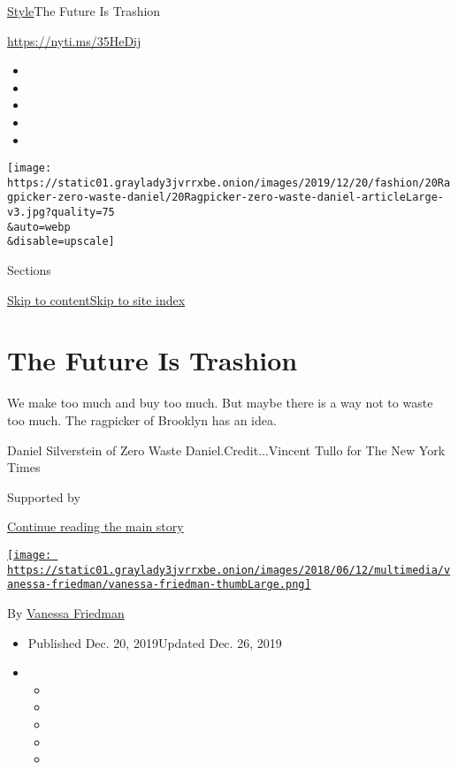 \href{/section/style}{Style}\textbar{}The Future Is Trashion

\href{https://nyti.ms/35HeDij}{https://nyti.ms/35HeDij}

\begin{itemize}
\item
\item
\item
\item
\item
\end{itemize}

\texttt{[image: https://static01.graylady3jvrrxbe.onion/images/2019/12/20/fashion/20Ragpicker-zero-waste-daniel/20Ragpicker-zero-waste-daniel-articleLarge-v3.jpg?quality=75\\\&auto=webp\\\&disable=upscale]}

Sections

\protect\hyperlink{site-content}{Skip to
content}\protect\hyperlink{site-index}{Skip to site index}

\hypertarget{the-future-is-trashion}{%
\section{The Future Is Trashion}\label{the-future-is-trashion}}

We make too much and buy too much. But maybe there is a way not to waste
too much. The ragpicker of Brooklyn has an idea.

Daniel Silverstein of Zero Waste Daniel.Credit...Vincent Tullo for The
New York Times

Supported by

\protect\hyperlink{after-sponsor}{Continue reading the main story}

\href{https://www.nytimes3xbfgragh.onion/by/vanessa-friedman}{\texttt{[image: https://static01.graylady3jvrrxbe.onion/images/2018/06/12/multimedia/vanessa-friedman/vanessa-friedman-thumbLarge.png]}}

By \href{https://www.nytimes3xbfgragh.onion/by/vanessa-friedman}{Vanessa
Friedman}

\begin{itemize}
\item
  Published Dec. 20, 2019Updated Dec. 26, 2019
\item
  \begin{itemize}
  \item
  \item
  \item
  \item
  \item
  \end{itemize}
\end{itemize}

